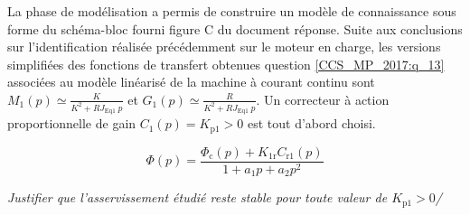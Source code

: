 La phase de modélisation a permis de construire un modèle de connaissance sous forme du schéma-bloc fourni figure C du document réponse. Suite aux conclusions sur l'identification réalisée précédemment sur le moteur en charge, les versions simplifiées des fonctions de transfert obtenues question \ref{CCS_MP_2017:q_13} associées au modèle linéarisé de la machine à courant continu sont $M_{1}(p) \simeq \frac{K}{K^{2}+R J_{\text {Eq1 }} p}$ et $G_{1}(p) \simeq \frac{R}{K^{2}+R J_{\text {Eq1 }} p}$.
Un correcteur à action proportionnelle de gain $C_{1}(p)=K_{\mathrm{p} 1}>0$ est tout d'abord choisi.
\fi


$$
\Phi(p)=\frac{\Phi_{\mathrm{c}}(p)+K_{1 \mathrm{r}} C_{\mathrm{r} 1}(p)}{1+a_{1} p+a_{2} p^{2}}
$$

\textit{Justifier que l'asservissement étudié reste stable pour toute valeur de $K_{\mathrm{p} 1}>0$/}

